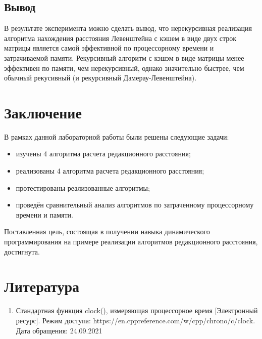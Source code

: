 \documentclass{report}
\begin{document}
\section{Вывод}

В результате эксперимента можно сделать вывод, что нерекурсивная реализация алгоритма нахождения расстояния Левенштейна с кэшем в виде двух строк матрицы является самой эффективной по процессорному времени и затрачиваемой памяти. Рекурсивный алгоритм с кэшэм в виде матрицы менее эффективен по памяти, чем нерекурсивный, однако значительно быстрее, чем обычный рекусивный (и рекурсивный Дамерау-Левенштейна).


\chapter*{Заключение}

В рамках данной лабораторной работы были решены следующие задачи:

\begin{itemize}
	\item изучены 4 алгоритма расчета редакционного расстояния;
	\item реализованы 4 алгоритма расчета редакционного расстояния;
	\item протестированы реализованные алгоритмы;
	\item проведён сравнительный анализ алгоритмов по затраченному процессорному времени и памяти.
\end{itemize}
Поставленная цель, состоящая в получении навыка динамического программирования на примере реализации алгоритмов редакционного расстояния, достигнута.

\chapter*{Литература}
\begin{enumerate}
	\item Стандартная функция clock(), измеряющая процессорное время [Электронный ресурс]. Режим доступа: https://en.cppreference.com/w/cpp/chrono/c/clock. Дата обращения: 24.09.2021
\end{enumerate}
\end{document}
